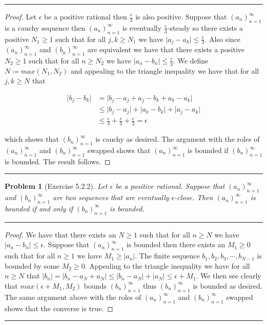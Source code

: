 \documentclass{article}
\newcommand{\lined}{\noindent\rule{\textwidth}{1pt}}
\newtheorem*{problem}{Problem}
\begin{document}
	\lined
		\begin{proof}
			Let $\epsilon$ be a positive rational then $\frac{\epsilon}{3}$ is also positive. Suppose that $(a_n)_{n = 1}^{\infty}$ is a cauchy sequence then $(a_n)_{n = 1}^{\infty}$ is eventually $\frac{\epsilon}{3}$-steady so there exists a positive $N_1 \geq 1$ such that for all $j,k \geq N_1$ we have $\lvert a_j - a_k \rvert \leq \frac{\epsilon}{3}$. Also since $(a_n)_{n = 1}^{\infty}$ and  $(b_n)_{n = 1}^{\infty}$ are equivalent we have that there exists a positive $N_2 \geq 1$ such that for all $n \geq N_2$ we have $\lvert a_n - b_n \rvert \leq \frac{\epsilon}{3}$. 
We define $N \coloneqq max(N_1, N_2)$ and appealing to the triangle inequality we have that for all $j,k \geq N$ that 

	\begin{align*}
		\lvert b_j - b_k \rvert  & = \lvert b_j - a_j + a_j  - b_k + a_k - a_k \rvert \\ & \leq \lvert b_j - a_j \rvert  + \lvert a_k - b_k \rvert + \lvert a_j - a_k \rvert 
		 \\ & \leq \frac{\epsilon}{3} + \frac{\epsilon}{3} + \frac{\epsilon}{3} = \epsilon
	\end{align*}
	
	\noindent which shows that $(b_n)_{n = 1}^{\infty}$ is cauchy as desired. The argument with the roles of $(a_n)_{n = 1}^{\infty}$ and  $(b_n)_{n = 1}^{\infty}$ swapped shows that $(a_n)_{n = 1}^{\infty}$ is bounded if $(b_n)_{n = 1}^{\infty}$ is bounded. The result follows.
		\end{proof}
	\lined
	
	\newpage
	
	\begin{problem}[Exercise 5.2.2]
		Let $\epsilon$ be a positive rational. Suppose that $(a_n)_{n = 1}^{\infty}$ and  $(b_n)_{n = 1}^{\infty}$ are two sequences that are eventually $\epsilon$-close. Then $(a_n)_{n = 1}^{\infty}$ is bounded if and  only if $(b_n)_{n = 1}^{\infty}$ is bounded.
	\end{problem}
	
	\lined
		\begin{proof}
			We have that there exists an $N \geq 1$ such that for all $n \geq N$ we have $\lvert a_n - b_n \rvert \leq \epsilon$. Suppose that $(a_n)_{n = 1}^{\infty}$ is bounded then there exists an $M_1 \geq 0$ such that for all $n \geq 1$ we have $M_1 \geq \lvert a_n \rvert$. The finite sequence $b_1,b_2,b_3,\cdots,b_{N-1}$ is bounded by some $M_2 \geq 0$. Appealing to the triangle inequality we have for all $n \geq N$ that $\lvert b_n \rvert = \lvert b_n - a_N + a_N \rvert \leq 
			 \lvert b_n - a_N \rvert + \lvert a_N \rvert \leq \epsilon + M_1$. 
	We then see clearly that $max(\epsilon + M_1, M_2)$ bounds $(b_n)_{n = 1}^{\infty}$ thus $(b_n)_{n = 1}^{\infty}$ is bounded as desired. The same argument above with the roles of $(a_n)_{n = 1}^{\infty}$ and $(b_n)_{n = 1}^{\infty}$ swapped shows that the converse is true. 
		\end{proof}
	\lined
	
\end{document}
